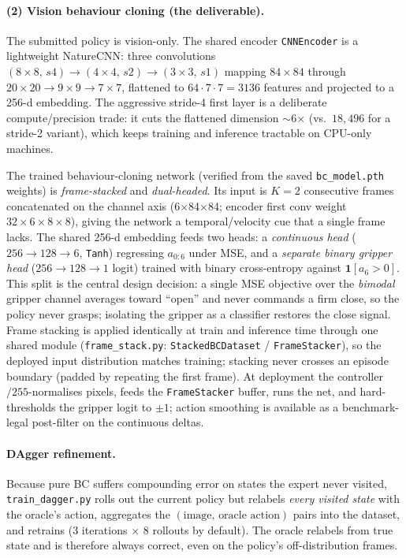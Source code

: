 \documentclass[10pt]{article}
\newcommand{\code}[1]{\texttt{\small #1}}
\begin{document}
\paragraph{(2) Vision behaviour cloning (the deliverable).}
The submitted policy is vision-only. The shared encoder \code{CNNEncoder} is a
lightweight NatureCNN: three convolutions
$(8{\times}8,\,s4)\!\to\!(4{\times}4,\,s2)\!\to\!(3{\times}3,\,s1)$ mapping
$84{\times}84$ through $20{\times}20\!\to\!9{\times}9\!\to\!7{\times}7$, flattened to
$64\cdot7\cdot7=3136$ features and projected to a 256-d embedding. The aggressive
stride-4 first layer is a deliberate compute/precision trade: it cuts the flattened
dimension $\sim$6$\times$ (vs.\ $18{,}496$ for a stride-2 variant), which keeps
training and inference tractable on CPU-only machines.

The trained behaviour-cloning network (verified from the saved
\code{bc\_model.pth} weights) is \emph{frame-stacked} and \emph{dual-headed}. Its
input is $K{=}2$ consecutive frames concatenated on the channel axis
(6$\times$84$\times$84; encoder first conv weight $32{\times}6{\times}8{\times}8$),
giving the network a temporal/velocity cue that a single frame lacks. The shared
256-d embedding feeds two heads: a \emph{continuous head}
($256\!\to\!128\!\to\!6$, \code{Tanh}) regressing $a_{0:6}$ under MSE, and a
\emph{separate binary gripper head} ($256\!\to\!128\!\to\!1$ logit) trained with
binary cross-entropy against $\mathbf{1}[a_6>0]$. This split is the central design
decision: a single MSE objective over the \emph{bimodal} gripper channel averages
toward ``open'' and never commands a firm close, so the policy never grasps;
isolating the gripper as a classifier restores the close signal. Frame stacking is
applied identically at train and inference time through one shared module
(\code{frame\_stack.py}: \code{StackedBCDataset} / \code{FrameStacker}), so the
deployed input distribution matches training; stacking never crosses an episode
boundary (padded by repeating the first frame). At deployment the controller
$/255$-normalises pixels, feeds the \code{FrameStacker} buffer, runs the net, and
hard-thresholds the gripper logit to $\pm1$; action smoothing is available as a
benchmark-legal post-filter on the continuous deltas.

\paragraph{DAgger refinement.} Because pure BC suffers compounding error on
states the expert never visited, \code{train\_dagger.py} rolls out the current
policy but relabels \emph{every visited state} with the oracle's action, aggregates
the $(\text{image},\,\text{oracle action})$ pairs into the dataset, and retrains
(3 iterations $\times$ 8 rollouts by default). The oracle relabels from true state
and is therefore always correct, even on the policy's off-distribution frames.
\end{document}
